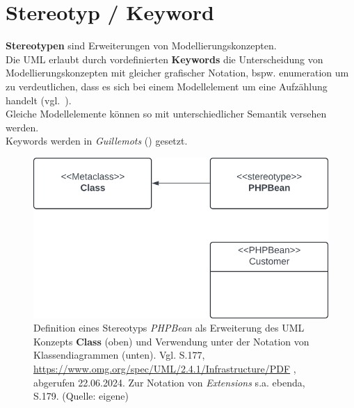 \section{Stereotyp / Keyword}

\begin{tcolorbox}[title=Konzept der Stereotypen]
    \textbf{Stereotypen} sind Erweiterungen von Modellierungskonzepten.\\

    \noindent
    Die UML erlaubt durch vordefinierten \textbf{Keywords} die Unterscheidung von Modellierungskonzepten mit gleicher grafischer Notation,  bspw. {\guillemotleft enumeration\guillemotright} um zu verdeutlichen, dass es sich bei einem Modellelement um eine Aufzählung handelt (vgl.~\cite[28]{Bal05}).\\
    Gleiche Modellelemente können so mit unterschiedlicher Semantik versehen werden.\\
    Keywords werden in \textit{Guillemots} (\guillemotleft \guillemotright) gesetzt.\\

\end{tcolorbox}


\begin{figure}
    \centering
    \includegraphics[scale=0.4]{chapters/Anhang/CheatSheets/SE3/img/stereotyp}
    \caption{
        Definition eines Stereotyps \textit{PHPBean} als Erweiterung des UML Konzepts \textbf{Class} (oben) und Verwendung unter der Notation von Klassendiagrammen (unten).
        Vgl. S.177, \url{https://www.omg.org/spec/UML/2.4.1/Infrastructure/PDF} , abgerufen 22.06.2024. Zur Notation von \textit{Extensions} s.a. ebenda, S.179.
        (Quelle: eigene)
    }
\end{figure}



